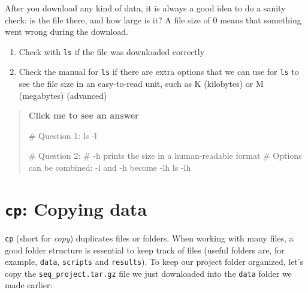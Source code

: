 \documentclass[
  letterpaper,
  DIV=11,
  numbers=noendperiod]{scrreprt}
\newenvironment{Shaded}{}{}
\newcommand{\AttributeTok}[1]{\textcolor[rgb]{0.84,0.23,0.29}{#1}}
\newcommand{\CommentTok}[1]{\textcolor[rgb]{0.42,0.45,0.49}{#1}}
\newcommand{\FunctionTok}[1]{\textcolor[rgb]{0.44,0.26,0.76}{#1}}
\providecommand{\tightlist}{%
  \setlength{\itemsep}{0pt}\setlength{\parskip}{0pt}}
\begin{document}
After you download any kind of data, it is always a good idea to do a
sanity check: is the file there, and how large is it? A file size of 0
means that something went wrong during the download.

\begin{tcolorbox}[enhanced jigsaw, coltitle=black, breakable, titlerule=0mm, colback=white, rightrule=.15mm, bottomrule=.15mm, toprule=.15mm, colframe=quarto-callout-color-frame, colbacktitle=quarto-callout-color!10!white, bottomtitle=1mm, opacitybacktitle=0.6, toptitle=1mm, leftrule=.75mm, arc=.35mm, title=\textcolor{quarto-callout-color}{\faInfo}\hspace{0.5em}{Exercise}, left=2mm, opacityback=0]

\begin{enumerate}
\def\labelenumi{\arabic{enumi}.}
\tightlist
\item
  Check with \texttt{ls} if the file was downloaded correctly
\item
  Check the manual for \texttt{ls} if there are extra options that we
  can use for \texttt{ls} to see the file size in an easy-to-read unit,
  such as K (kilobytes) or M (megabytes) (advanced)
\end{enumerate}

\begin{quote}
\textbf{Click me to see an answer}

\begin{Shaded}
\begin{Highlighting}[]
\CommentTok{\# Question 1:}
\FunctionTok{ls} \AttributeTok{{-}l}

\CommentTok{\# Question 2:}
\CommentTok{\# {-}h prints the size in a human{-}readable format}
\CommentTok{\# Options can be combined: {-}l and {-}h become {-}lh}
\FunctionTok{ls} \AttributeTok{{-}lh}
\end{Highlighting}
\end{Shaded}
\end{quote}

\end{tcolorbox}

\section{\texorpdfstring{\texttt{cp}: Copying
data}{cp: Copying data}}\label{cp-copying-data}

\texttt{cp} (short for \emph{copy}) duplicates files or folders. When
working with many files, a good folder structure is essential to keep
track of files (useful folders are, for example, \texttt{data},
\texttt{scripts} and \texttt{results}). To keep our project folder
organized, let's copy the \texttt{seq\_project.tar.gz} file we just
downloaded into the \texttt{data} folder we made earlier:
\end{document}
